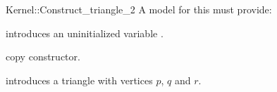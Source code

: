 \begin{ccRefFunctionObjectConcept}{Kernel::Construct_triangle_2}
A model for this must provide:


\ccHidden {}
             {introduces an uninitialized variable .}

\ccHidden {}
 	    {copy constructor.}


            {introduces a triangle  with vertices $p$,  $q$ and $r$.}

\end{ccRefFunctionObjectConcept}
